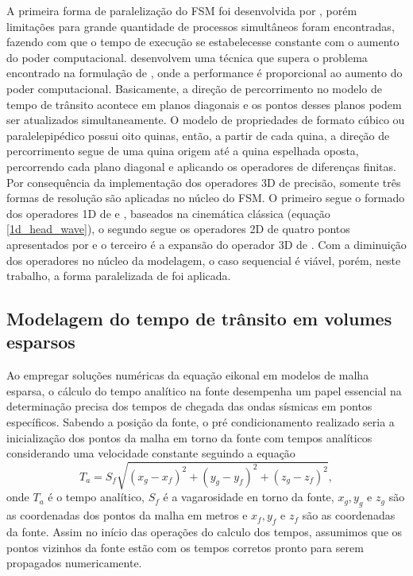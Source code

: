 A primeira forma de paralelização do FSM foi desenvolvida por , porém limitações para grande quantidade de processos simultâneos foram encontradas, fazendo com que o tempo de execução se estabelecesse constante com o aumento do poder computacional.  desenvolvem uma técnica que supera o problema encontrado na formulação de , onde a performance é proporcional ao aumento do poder computacional. Basicamente, a direção de percorrimento no modelo de tempo de trânsito acontece em planos diagonais e os pontos desses planos podem ser atualizados simultaneamente. O modelo de propriedades de formato cúbico ou paralelepipédico possui oito quinas, então, a partir de cada quina, a direção de percorrimento segue de uma quina origem até a quina espelhada oposta, percorrendo cada plano diagonal e aplicando os operadores de diferenças finitas. Por consequência da implementação dos operadores 3D de precisão, somente três formas de resolução são aplicadas no núcleo do FSM. O primeiro segue o formado dos operadores 1D de  e , baseados na cinemática clássica (equação \ref{1d_head_wave}), o segundo segue os operadores 2D de quatro pontos apresentados por  e o terceiro é a expansão do operador 3D de . Com a diminuição dos operadores no núcleo da modelagem, o caso sequencial é viável, porém, neste trabalho, a forma paralelizada de  foi aplicada.  

\subsection{Modelagem do tempo de trânsito em volumes esparsos}

Ao empregar soluções numéricas da equação eikonal em modelos de malha esparsa, o cálculo do tempo analítico na fonte desempenha um papel essencial na determinação precisa dos tempos de chegada das ondas sísmicas em pontos específicos. Sabendo a posição da fonte, o pré condicionamento realizado seria a inicialização dos pontos da malha em torno da fonte com tempos analíticos considerando uma velocidade constante seguindo a equação
\begin{equation}
	T_a = S_f \sqrt{(x_g - x_f)^2 + (y_g - y_f)^2 + (z_g - z_f)^2}, 
	\label{analyticalT}
\end{equation} 
\noindent onde $T_a$ é o tempo analítico, $S_f$ é a vagarosidade en torno da fonte, $x_g,y_g$ e $z_g$ são as coordenadas dos pontos da malha em metros e $x_f,y_f$ e $z_f$ são as coordenadas da fonte. Assim no início das operações do calculo dos tempos, assumimos que os pontos vizinhos da fonte estão com os tempos corretos pronto para serem propagados numericamente.    


